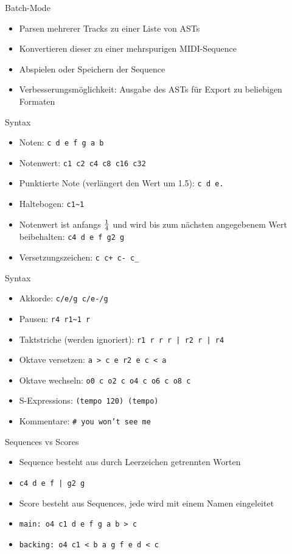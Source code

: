 \documentclass[presentation]{beamer}
\begin{document}
\begin{frame}[label=sec-4-4]{Batch-Mode}
\begin{itemize}
\item Parsen mehrerer Tracks zu einer Liste von ASTs
\item Konvertieren dieser zu einer mehrspurigen MIDI-Sequence
\item Abspielen oder Speichern der Sequence
\item Verbesserungsmöglichkeit: Ausgabe des ASTs für Export zu beliebigen
Formaten
\end{itemize}
\end{frame}

\begin{frame}[fragile,label=sec-4-5]{Syntax}
 \begin{itemize}
\item Noten: \texttt{c d e f g a b}
\item Notenwert: \texttt{c1 c2 c4 c8 c16 c32}
\item Punktierte Note (verlängert den Wert um 1.5): \texttt{c d e.}
\item Haltebogen: \texttt{c1\textasciitilde{}1}
\item Notenwert ist anfangs $1\over{4}$ und wird bis zum nächsten
angegebenem Wert beibehalten: \texttt{c4 d e f g2 g}
\item Versetzungszeichen: \texttt{c c+ c- c\_}
\end{itemize}
\end{frame}

\begin{frame}[fragile,label=sec-4-6]{Syntax}
 \begin{itemize}
\item Akkorde: \texttt{c/e/g c/e-/g}
\item Pausen: \texttt{r4 r1\textasciitilde{}1 r}
\item Taktstriche (werden ignoriert): \texttt{r1 r r r | r2 r | r4}
\item Oktave versetzen: \texttt{a > c e r2 e c < a}
\item Oktave wechseln: \texttt{o0 c o2 c o4 c o6 c o8 c}
\item S-Expressions: \texttt{(tempo 120) (tempo)}
\item Kommentare: \texttt{\# you won't see me}
\end{itemize}
\end{frame}

\begin{frame}[fragile,label=sec-4-7]{Sequences vs Scores}
 \begin{itemize}
\item Sequence besteht aus durch Leerzeichen getrennten Worten
\item \texttt{c4 d e f | g2 g}
\item Score besteht aus Sequences, jede wird mit einem Namen eingeleitet
\item \texttt{main: o4 c1 d e f g a b > c}
\item \texttt{backing: o4 c1 < b a g f e d < c}
\end{itemize}
\end{frame}
\end{document}
